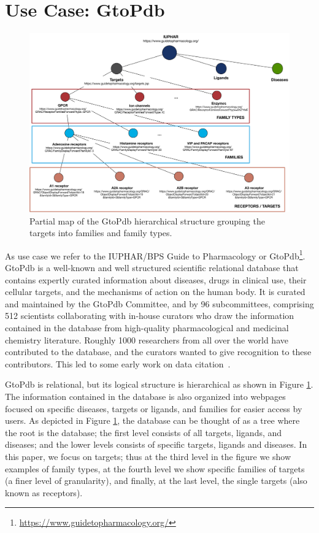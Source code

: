 \section{Use Case: GtoPdb}
\label{section:use_case}

\begin{figure}[t]
\centering
  \includegraphics[width=.9\textwidth]{figures/iuphar_schema}
  \caption{Partial map of the GtoPdb hierarchical structure grouping the targets into families and family types.}
  \label{figure:iuphar_schema}
\end{figure}

As use case we refer to the IUPHAR/BPS Guide to Pharmacology \citep{iuphar2018} or  GtoPdb\footnote{\url{https://www.guidetopharmacology.org/}}.
GtoPdb is a well-known and well structured scientific relational database that contains expertly curated information about diseases, drugs in clinical use, their cellular targets, and the mechanisms of action on the human body. 
It is curated and maintained by the GtoPdb Committee, and by 96 subcommittees, comprising 512 scientists collaborating with in-house curators who draw the information contained in the database from high-quality pharmacological and medicinal chemistry literature.
Roughly 1000 researchers from all over the world have contributed to the database, and the curators wanted to give recognition to these contributors.  This led to some early work on data citation~\citep{buneman2006cite}.  

GtoPdb is relational, but its logical structure is hierarchical as shown in Figure \ref{figure:iuphar_schema}.  The information contained in the database is also organized into webpages focused on specific diseases, targets or ligands, and families %
for easier access by users. 
As depicted in Figure \ref{figure:iuphar_schema}, the database can be thought of as a tree where the root is the database; the first level consists of all targets, ligands, and diseases; and the lower levels consists of specific targets, ligands and diseases. 
In this paper, we focus on targets; thus at the third level in the figure we show examples of family types, at the fourth level we show specific families of targets (a finer level of granularity), and finally, at the last level, the single targets (also known as receptors). 

